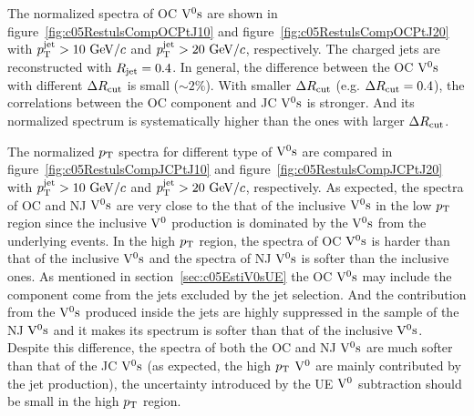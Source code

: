 The normalized spectra of OC ${\rm V}^{0}{\rm s}$ are shown in
figure~\ref{fig:c05RestulsCompOCPtJ10} and
figure~\ref{fig:c05RestulsCompOCPtJ20} with $p_{\rm T}^{\rm jet}>10~{\rm GeV}/c$ and
$p_{\rm T}^{\rm jet}>20~{\rm GeV}/c$, respectively.
The charged jets are reconstructed with $R_{\rm jet}=0.4$.
In general, the difference between the OC ${\rm V}^{0}{\rm s}$ with
different $\Delta R_{\rm cut}$ is small ($\sim 2\%$).
With smaller $\Delta R_{\rm cut}$ (e.g. $\Delta R_{\rm cut}=0.4$),
the correlations between the OC component and JC ${\rm V}^{0}{\rm s}$ is stronger.
And its normalized spectrum is systematically higher
than the ones with  larger $\Delta R_{\rm cut}$.


The normalized $p_{\rm T}$ spectra for different type of ${\rm V}^{0}{\rm s}$ are
compared in figure~\ref{fig:c05RestulsCompJCPtJ10} and
figure~\ref{fig:c05RestulsCompJCPtJ20}
with $p_{\rm T}^{\rm jet}>10~{\rm GeV}/c$ and $p_{\rm T}^{\rm jet}>20~{\rm GeV}/c$, respectively.
As expected, the spectra of OC and NJ ${\rm V}^{0}{\rm s}$ are very close to the that
of the inclusive ${\rm V}^{0}{\rm s}$ in the low $p_{\rm T}$ region since the
inclusive ${\rm V}^{0}$ production is dominated by the ${\rm V}^{0}{\rm s}$ from
the underlying events.
In the high $p_{\rm T}$ region,
the spectra of OC ${\rm V}^{0}{\rm s}$ is harder than that of the inclusive ${\rm V}^{0}{\rm s}$
and the spectra of NJ ${\rm V}^{0}{\rm s}$ is softer than the inclusive ones.
As mentioned in section~\ref{sec:c05EstiV0sUE} the OC ${\rm V}^{0}{\rm s}$ may include
the component come from the jets excluded by the jet selection.
And the contribution from the ${\rm V}^{0}{\rm s}$ produced inside the jets are
highly suppressed in the sample of the NJ ${\rm V}^{0}{\rm s}$ and it makes its
spectrum is softer than that of the inclusive ${\rm V}^{0}{\rm s}$.
Despite this difference, the spectra of both the OC and NJ ${\rm V}^{0}{\rm s}$
are much softer than that of the JC ${\rm V}^{0}{\rm s}$ (as expected,
the high $p_{\rm T}$ ${\rm V}^{0}$ are mainly contributed by the jet production),
the uncertainty introduced by the UE ${\rm V}^{0}$ subtraction should be
small in the high $p_{\rm T}$ region.
